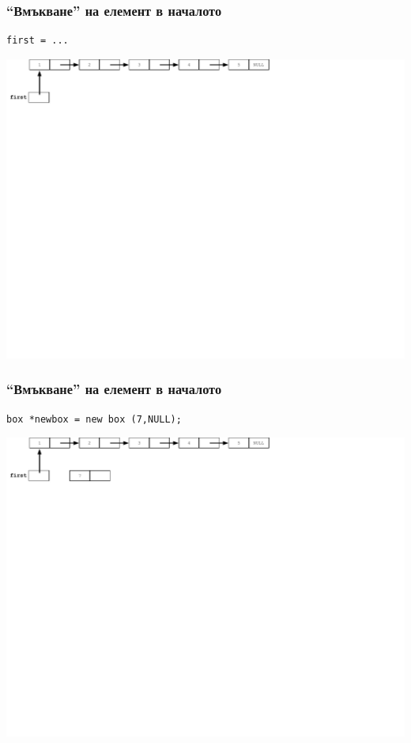 \documentclass{beamer}
\begin{document}
\begin{frame}[fragile]
\frametitle{``Вмъкване'' на елемент в началото}

\begin{flushleft}
\begin{lstlisting}
first = ...
\end{lstlisting}  
\end{flushleft}


\includegraphics[width=14.0cm]{images/02_ll_flatchain}

\end{frame}


\begin{frame}[fragile]
\frametitle{``Вмъкване'' на елемент в началото}

\begin{flushleft}
\begin{lstlisting}
box *newbox = new box (7,NULL);
\end{lstlisting}  
\end{flushleft}


\includegraphics[width=14.0cm]{images/03_ll_push_initial}

\end{frame}
\end{document}
